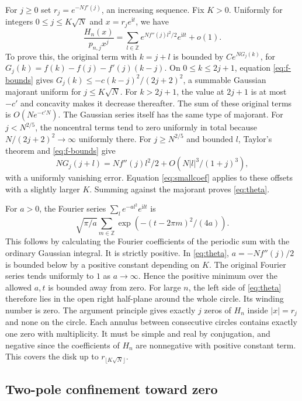 \documentclass[11pt]{article}
\newcommand{\ii}{\mathrm i}
\begin{document}
For \(j\ge0\) set \(r_j=e^{-Nf'(j)}\), an increasing sequence. Fix \(K>0\). Uniformly for integers \(0\le j\le K\sqrt N\) and \(x=r_j e^{\ii t}\), we have
\begin{equation}\label{eq:theta}
 \frac{H_n(x)}{p_{n,j}x^j}=
 \sum_{l\in\mathbb Z}e^{N f''(j)l^2/2}e^{\ii l t}+o(1).
\end{equation}
To prove this, the original term with \(k=j+l\) is bounded by \(C e^{NG_j(k)}\), for \(G_j(k)=f(k)-f(j)-f'(j)(k-j)\). On \(0\le k\le2j+1\), equation \eqref{eq:f-bounds} gives \(G_j(k)\le-c(k-j)^2/(2j+2)^2\), a summable Gaussian majorant uniform for \(j\le K\sqrt N\). For \(k>2j+1\), the value at \(2j+1\) is at most \(-c'\) and concavity makes it decrease thereafter. The sum of these original terms is \(O(Ne^{-c'N})\). The Gaussian series itself has the same type of majorant. For \(j<N^{2/5}\), the noncentral terms tend to zero uniformly in total because \(N/(2j+2)^2\to\infty\) uniformly there. For \(j\ge N^{2/5}\) and bounded \(l\), Taylor's theorem and \eqref{eq:f-bounds} give
\[
 NG_j(j+l)=N f''(j)l^2/2+O(N |l|^3/(1+j)^3),
\]
with a uniformly vanishing error. Equation \eqref{eq:smallcoef} applies to these offsets with a slightly larger \(K\). Summing against the majorant proves \eqref{eq:theta}.

For \(a>0\), the Fourier series \(\sum_l e^{-a l^2}e^{\ii l t}\) is
\[
 \sqrt{\pi/a}\sum_{m\in\mathbb Z}\exp(-(t-2\pi m)^2/(4a)).
\]
This follows by calculating the Fourier coefficients of the periodic sum with the ordinary Gaussian integral. It is strictly positive. In \eqref{eq:theta}, \(a=-N f''(j)/2\) is bounded below by a positive constant depending on \(K\). The original Fourier series tends uniformly to \(1\) as \(a\to\infty\). Hence the positive minimum over the allowed \(a,t\) is bounded away from zero. For large \(n\), the left side of \eqref{eq:theta} therefore lies in the open right half-plane around the whole circle. Its winding number is zero. The argument principle gives exactly \(j\) zeros of \(H_n\) inside \(|x|=r_j\) and none on the circle. Each annulus between consecutive circles contains exactly one zero with multiplicity. It must be simple and real by conjugation, and negative since the coefficients of \(H_n\) are nonnegative with positive constant term. This covers the disk up to \(r_{\lfloor K\sqrt N\rfloor}\).

\subsection{Two-pole confinement toward zero}
\end{document}
